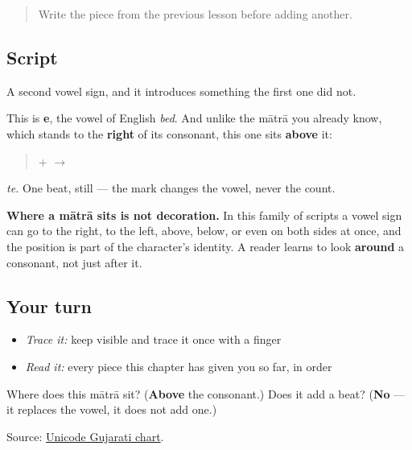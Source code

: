 \label{lesson:GU-W01-e-matra}



\begin{quote}
Write the piece from the previous lesson before adding another.
\end{quote}

\subsection*{Script}
A second vowel sign, and it introduces something the first one did not.

\begin{quote}
\end{quote}

This is \textbf{e}, the vowel of English \emph{bed}. And unlike the mātrā you already know, which stands to the \textbf{right} of its consonant, this one sits \textbf{above} it:

\begin{quote}
\textbf{} + \textbf{} $\to$ \textbf{}
\end{quote}

\emph{te.} One beat, still — the mark changes the vowel, never the count.

\textbf{Where a mātrā sits is not decoration.} In this family of scripts a vowel sign can go to the right, to the left, above, below, or even on both sides at once, and the position is part of the character's identity. A reader learns to look \textbf{around} a consonant, not just after it.

\subsection*{Your turn}
\begin{itemize}
\raggedright
  \item \emph{Trace it:} keep  visible and trace it once with a finger
  \item \emph{Read it:} every piece this chapter has given you so far, in order
\end{itemize}

\begin{tcolorbox}[breakable,colback=teal!4,colframe=teal!35!black,title={Before you move on}]
Where does this mātrā sit? (\textbf{Above} the consonant.) Does it add a beat? (\textbf{No} — it replaces the vowel, it does not add one.)

Source: \href{https://www.unicode.org/charts/PDF/U0A80.pdf}{Unicode Gujarati chart}.
\end{tcolorbox}
